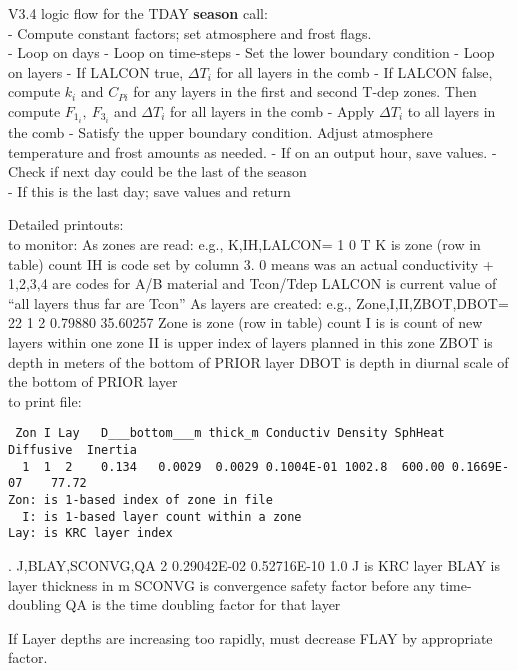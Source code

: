 \documentclass{article}
\begin{document}
\vspace{2.mm}
\large V3.4 logic flow for the TDAY \textbf{season} call: \normalsize
\\ - Compute constant factors; set atmosphere and frost flags.
\\ - Loop on days
\qi - Loop on time-steps
\qii - Set the lower boundary condition
\qii - Loop on layers
\qiii - If LALCON true, $\Delta T_i$ for all layers in the comb  
\qiii - If LALCON false, compute $k_i$ and $C_{Pi}$ for any layers in the first and second T-dep zones. 
\qiiii Then compute  $F_{1_i}, \ F_{3_i}$ and $\Delta T_i$ for all layers in the comb   
\qii - Apply  $\Delta T_i$ to all layers in the comb 
\qii - Satisfy the upper boundary condition. Adjust atmosphere temperature and frost amounts as needed.
\qii - If on an output hour, save values.
\qi - Check if next day could be the last of the season
\\ - If this is the last day; save values and return


\vspace{2.mm}
\large  Detailed printouts: \normalsize
 \\ to monitor: 
\qi As zones are read: e.g.,  K,IH,LALCON=           1           0 T
\qii K is zone (row in table) count
\qii IH is code set by column 3. 0 means was an actual conductivity
\qiii + 1,2,3,4 are codes for A/B material and Tcon/Tdep
\qii LALCON is current value of ``all layers thus far are Tcon''
\qi As layers are created: e.g.,  Zone,I,II,ZBOT,DBOT= 22  1  2     0.79880    35.60257
\qii Zone is zone (row in table) count
\qii I is is count of new layers within one zone
\qii II is upper index of layers planned in this zone
\qii ZBOT is depth in meters of the bottom of PRIOR layer
\qii DBOT is depth in diurnal scale of the bottom of PRIOR layer
 \\ to print file:
 \vspace{-3.mm} 
\begin{verbatim}   
 Zon I Lay   D___bottom___m thick_m Conductiv Density SphHeat  Diffusive  Inertia
  1  1  2    0.134   0.0029  0.0029 0.1004E-01 1002.8  600.00 0.1669E-07    77.72
Zon: is 1-based index of zone in file
  I: is 1-based layer count within a zone
Lay: is KRC layer index
\end{verbatim} .
\qi J,BLAY,SCONVG,QA   2 0.29042E-02 0.52716E-10     1.0
\qii J is KRC layer 
\qii BLAY is  layer thickness in m
\qii SCONVG is convergence safety factor before any time-doubling
\qii QA is the time doubling factor for that layer
  
If Layer depths are increasing too rapidly, must decrease FLAY by appropriate factor.
\end{document}
